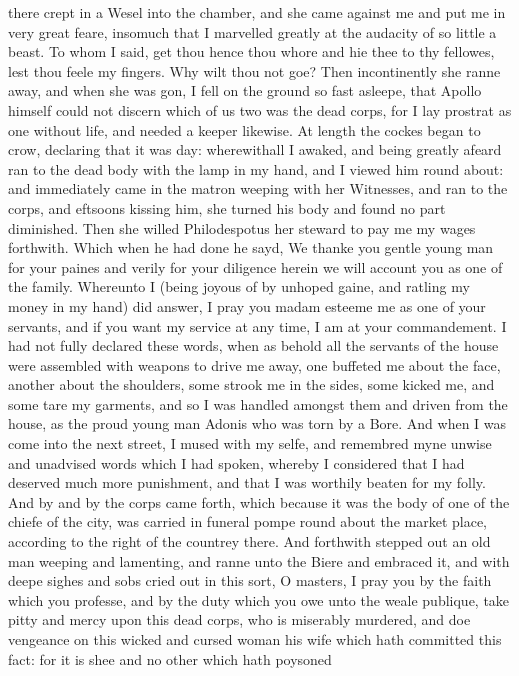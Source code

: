 there crept in a Wesel into the chamber, and she came against me and put me in
very great feare, insomuch that I marvelled greatly at the audacity of so
little a beast. To whom I said, get thou hence thou whore and hie thee to thy
fellowes, lest thou feele my fingers. Why wilt thou not goe? Then incontinently
she ranne away, and when she was gon, I fell on the ground so fast asleepe,
that Apollo himself could not discern which of us two was the dead corps, for I
lay prostrat as one without life, and needed a keeper likewise. At length the
cockes began to crow, declaring that it was day: wherewithall I awaked, and
being greatly afeard ran to the dead body with the lamp in my hand, and I
viewed him round about: and immediately came in the matron weeping with her
Witnesses, and ran to the corps, and eftsoons kissing him, she turned his body
and found no part diminished. Then she willed Philodespotus her steward to pay
me my wages forthwith. Which when he had done he sayd, We thanke you gentle
young man for your paines and verily for your diligence herein we will account
you as one of the family. Whereunto I (being joyous of by unhoped gaine, and
ratling my money in my hand) did answer, I pray you madam esteeme me as one of
your servants, and if you want my service at any time, I am at your
commandement. I had not fully declared these words, when as behold all the
servants of the house were assembled with weapons to drive me away, one
buffeted me about the face, another about the shoulders, some strook me in the
sides, some kicked me, and some tare my garments, and so I was handled amongst
them and driven from the house, as the proud young man Adonis who was torn by a
Bore. And when I was come into the next street, I mused with my selfe, and
remembred myne unwise and unadvised words which I had spoken, whereby I
considered that I had deserved much more punishment, and that I was worthily
beaten for my folly. And by and by the corps came forth, which because it was
the body of one of the chiefe of the city, was carried in funeral pompe round
about the market place, according to the right of the countrey there. And
forthwith stepped out an old man weeping and lamenting, and ranne unto the
Biere and embraced it, and with deepe sighes and sobs cried out in this sort, O
masters, I pray you by the faith which you professe, and by the duty which you
owe unto the weale publique, take pitty and mercy upon this dead corps, who is
miserably murdered, and doe vengeance on this wicked and cursed woman his wife
which hath committed this fact: for it is shee and no other which hath poysoned
